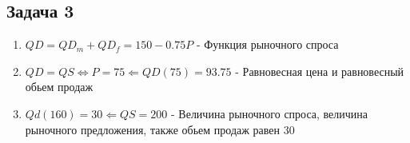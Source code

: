 \documentclass[a4paper,12pt]{article}
\begin{document}
\subsection{Задача 3}
\begin{enumerate}
    \item $QD = QD_m +QD_f = 150-0.75P$ - Функция рыночного спроса
    \item $QD = QS \Leftrightarrow P = 75 \Leftarrow QD(75)=93.75$ - Равновесная цена и равновесный обьем продаж
    \item $Qd(160)=30 \Leftarrow QS=200$ - Величина рыночного спроса, величина рыночного предложения, также обьем продаж равен 30
\end{enumerate}
\end{document}
